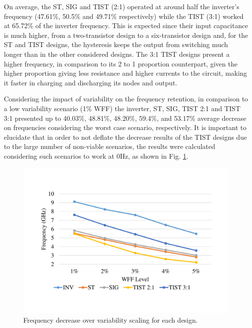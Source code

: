 \documentclass[pgmicro,mestrado,english]{iiufrgs}
\begin{document}
 On average, the ST, SIG and TIST (2:1) operated at around half the inverter's frequency (47.61\%, 50.5\% and 49.71\% respectively) while the TIST (3:1) worked at 65.72\% of the inverter frequency. This is expected since their input capacitance is much higher, from a two-transistor design to a six-transistor design and, for the ST and TIST designs, the hysteresis keeps the output from switching much longer than in the other considered designs. The 3:1 TIST designs present a higher frequency, in comparison to its 2 to 1 proportion counterpart, given the higher proportion giving less resistance and higher currents to the circuit, making it faster in charging and discharging its nodes and output. 

Considering the impact of variability on the frequency retention, in comparison to a low variability scenario (1\% WFF) the inverter, ST, SIG, TIST 2:1 and TIST 3:1 presented up to 40.03\%, 48.81\%, 48.20\%, 59.4\%, and 53.17\% average decrease on frequencies considering the worst case scenario, respectively. It is important to elucidate that in order to not deflate the decrease results of the TIST designs due to the large number of non-viable scenarios, the results were calculated considering such scenarios to work at 0Hz, as shown in Fig. \ref{fig:freqRetWFF}.  

\begin{figure}[]
\centering
\includegraphics[width=\textwidth, trim={2cm 3cm 2cm 3cm},clip]{freqRetWFF.pdf}
\caption{Frequency decrease over variability scaling for each design.}
\label{fig:freqRetWFF}
\end{figure}
\end{document}
